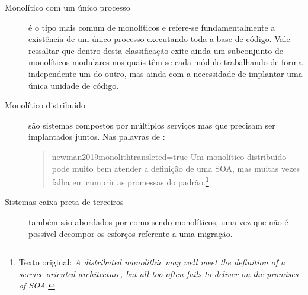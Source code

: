 \begin{description}
    \item [Monolítico com um único processo] é o tipo mais comum de monolíticos e refere-se
        fundamentalmente a existência de um único processo executando toda a base de código. Vale
        ressaltar que dentro desta classificação exite ainda um subconjunto de monolíticos
        modulares nos quais têm se cada módulo trabalhando de forma independente um do outro, mas
        ainda com a necessidade de implantar uma única unidade de código.

    \item [Monolítico distribuído] são sistemas compostos por múltiplos serviços mas que precisam
        ser implantados juntos. Nas palavras de :

        \begin{quotation}{newman2019monolith}{transleted=true}
        Um monolítico distribuído pode muito bem atender a definição de uma \gls{SOA}, mas muitas vezes
        falha em cumprir as promessas do padrão.\footnote{Texto original: \textit{A distributed
        monolithic may well meet the definition of a service oriented-architecture, but all too
        often fails to deliver on the promises of SOA.}}
        \end{quotation}
    \item [Sistemas caixa preta de terceiros] também são abordados por 
        como sendo monolíticos, uma vez que não é possível decompor os esforços referente a uma
        migração.
\end{description}

%

